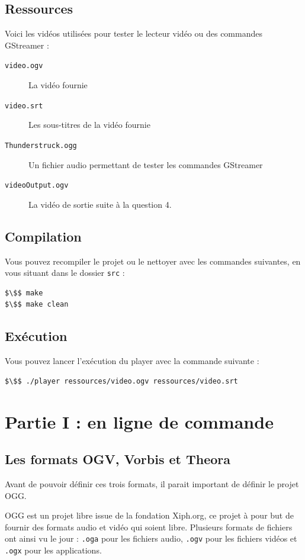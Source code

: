 \documentclass[a4paper, 11pt]{article}
\begin{document}
	\subsection{Ressources}\label{ressources}
	Voici les vidéos utilisées pour tester le lecteur vidéo ou des commandes GStreamer : 
	\begin{description}
		\item[\texttt{video.ogv}] La vidéo fournie
		\item[\texttt{video.srt}] Les sous-titres de la vidéo fournie
		\item[\texttt{Thunderstruck.ogg}] Un fichier audio permettant de tester les commandes GStreamer
		\item[\texttt{videoOutput.ogv}] La vidéo de sortie suite à la question 4.
	\end{description}

	\subsection{Compilation}
	Vous pouvez recompiler le projet ou le nettoyer avec les commandes suivantes, en vous situant dans le dossier \texttt{src} : 
	\begin{lstlisting}[language=Sh,numbers=none]
$\$$ make
$\$$ make clean
	\end{lstlisting}

	\subsection{Exécution}
	Vous pouvez lancer l'exécution du player avec la commande suivante : 
	\begin{lstlisting}[language=Sh]
$\$$ ./player ressources/video.ogv ressources/video.srt 
	\end{lstlisting}
	\section{Partie I : en ligne de commande}
	\subsection{Les formats OGV, Vorbis et Theora}
	Avant de pouvoir définir ces trois formats, il parait important de définir le projet OGG.

	OGG est un projet libre issue de la fondation Xiph.org, ce projet à pour but de fournir des formats audio et vidéo qui soient libre. Plusieurs formats de
	fichiers ont ainsi vu le jour : \texttt{.oga} pour les fichiers audio, \texttt{.ogv} pour les fichiers vidéos et \texttt{.ogx} pour les applications.
	
\end{document}
